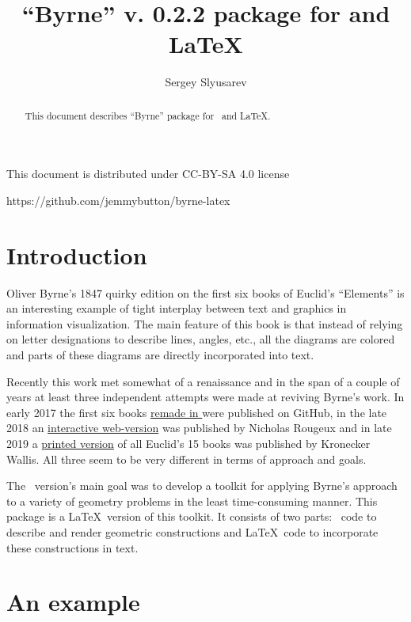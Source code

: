 \documentclass{ltxdoc}
\author{Sergey Slyusarev}
\title{``Byrne'' v. 0.2.2 package for \METAPOST and \LaTeX}
\begin{document}
\maketitle

\begin{abstract}
This document describes ``Byrne'' package for \METAPOST\ and \LaTeX.
\end{abstract}

\begin{centering}

This document is distributed under CC-BY-SA 4.0 license 

\ccbysa 

https://github.com/jemmybutton/byrne-latex

\end{centering}

\section{Introduction}
Oliver Byrne's 1847 quirky edition on the first six books of Euclid's ``Elements'' is an interesting example of tight interplay between text and graphics in information visualization. The main feature of this book is that instead of relying on letter designations to describe lines, angles, etc., all the diagrams are colored and parts of these diagrams are directly incorporated into text.

Recently this work met somewhat of a renaissance and in the span of a couple of years at least three independent attempts were made at reviving Byrne's work. In early 2017 the first six books \href{https://github.com/jemmybutton/byrne-euclid/}{remade in \ConTeXt} were published on GitHub, in the late 2018 an \href{https://www.c82.net/euclid/}{interactive web-version} was published by Nicholas Rougeux and in late 2019 a \href{https://www.kroneckerwallis.com/product/euclids-elements-completing-oliver-byrnes-work/}{printed version} of all Euclid's 15 books was published by Kronecker Wallis. All three seem to be very different in terms of approach and goals.

The \ConTeXt\ version's main goal was to develop a toolkit for applying Byrne's approach to a variety of geometry problems in the least time-consuming manner. This package is a \LaTeX\ version of this toolkit. It consists of two parts: \METAPOST\ code to describe and render geometric constructions and \LaTeX\ code to incorporate these constructions in text.

\section{An example}
\end{document}
